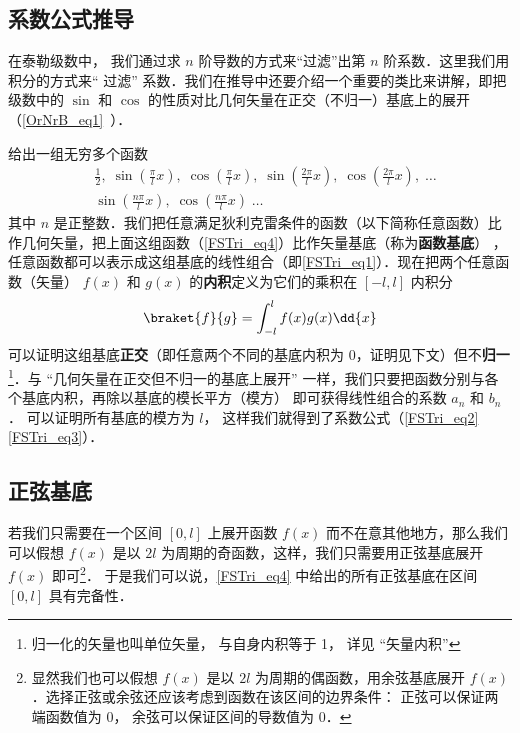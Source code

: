 \subsection{系数公式推导}

在泰勒级数中，%
我们通过求 $n$ 阶导数的方式来“过滤”出第 $n$ 阶系数．这里我们用积分的方式来“ 过滤” 系数．我们在推导中还要介绍一个重要的类比来讲解，即把级数中的 $\sin$ 和 $\cos$ 的性质对比几何矢量在正交（不归一）基底上的展开（\autoref{OrNrB_eq1}~）．

% 

给出一组无穷多个函数
\begin{equation}\label{FSTri_eq4}
\begin{aligned}
&\frac12,\;   \sin(\frac{\pi}{l} x),\;   \cos(\frac{\pi}{l} x),\;   \sin(\frac{2\pi}{l} x),\;   \cos(\frac{2\pi}{l} x),\;   \dots\\
&\sin(\frac{n\pi}{l} x),\;   \cos(\frac{n\pi}{l} x)\;   \dots
\end{aligned}\end{equation}
其中 $n$ 是正整数．我们把任意满足狄利克雷条件的函数（以下简称任意函数）比作几何矢量，把上面这组函数（\autoref{FSTri_eq4}）比作矢量基底（称为\textbf{函数基底}）
，任意函数都可以表示成这组基底的线性组合（即\autoref{FSTri_eq1}）．现在把两个任意函数（矢量） $f(x)$ 和 $g(x)$ 的\textbf{内积}定义为它们的乘积在 $[-l,l]$ 内积分
\begin{equation}
\braket{f}{g} = \int_{-l}^{l} f(x) g(x) \dd{x}
\end{equation}
可以证明这组基底\textbf{正交}（即任意两个不同的基底内积为 0，证明见下文）但不\textbf{归一}\footnote{归一化的矢量也叫单位矢量， 与自身内积等于 1， 详见 “矢量内积”}．与 “几何矢量在正交但不归一的基底上展开” 一样，我们只要把函数分别与各个基底内积，再除以基底的模长平方（模方）
即可获得线性组合的系数 $a_n$ 和 $b_n$． 可以证明所有基底的模方为 $l$， 这样我们就得到了系数公式（\autoref{FSTri_eq2} \autoref{FSTri_eq3}）．


\subsection{正弦基底}
若我们只需要在一个区间 $[0,l]$ 上展开函数 $f(x)$ 而不在意其他地方，那么我们可以假想 $f(x)$ 是以 $2l$ 为周期的奇函数，这样，我们只需要用正弦基底展开 $f(x)$ 即可\footnote{显然我们也可以假想 $f(x)$ 是以 $2l$ 为周期的偶函数，用余弦基底展开 $f(x)$．选择正弦或余弦还应该考虑到函数在该区间的边界条件： 正弦可以保证两端函数值为 0， 余弦可以保证区间的导数值为 0．}． 于是我们可以说，\autoref{FSTri_eq4} 中给出的所有正弦基底在区间 $[0,l]$ 具有完备性．

